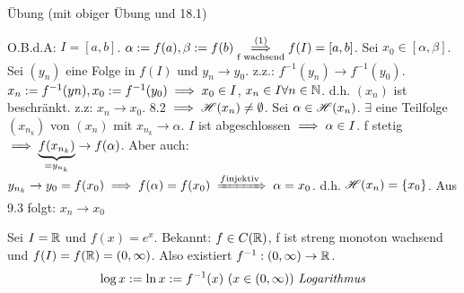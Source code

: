 \documentclass[a4paper,oneside,DIV15,BCOR12mm]{scrbook}
\begin{document}
\begin{beweis}
\begin{liste}
\item Übung (mit obiger Übung und 18.1)
\item O.B.d.A: $I=[a, b]$. $\alpha:=f(a), \beta:=f(b) \overset{(1)}{\underset{\text{f wachsend}}{\implies}} f(I)=[a,b]$. Sei $x_0 \in [\alpha, \beta]$. Sei $(y_n)$ eine Folge in $f(I)$ und $y_n \to y_0$. z.z.: $f^{-1}(y_n) \to f^{-1}(y_0)$. $x_n:=f^{-1}(yn), x_0:=f^{-1}(y_0) \implies x_0 \in I$, $x_n \in I \forall n \in \mathbb{N}$. d.h. $(x_n)$ ist beschränkt. z.z: $x_n \to x_0$. 8.2 $\implies \mathscr{H}(x_n) \ne \emptyset$. Sei $\alpha \in \mathscr{H}(x_n)$. $\exists$ eine Teilfolge $(x_{n_k})$ von $(x_n)$ mit $x_{n_k} \to \alpha$. $I$ ist abgeschlossen $\implies \alpha \in I$. f stetig $\implies \underbrace{f(x_{n_k})}_{=y_{n_k}} \to f(\alpha)$. Aber auch: $y_{n_k} \to y_0 = f(x_0) \folgt f(\alpha) = f(x_0) \folgtwegen{f \text{injektiv}} \alpha=x_0$. d.h. $\mathscr{H}(x_n)=\{x_0\}$. Aus 9.3 folgt: $x_n \to x_0$
\end{liste}
\end{beweis}

\begin{satz}
Sei $I=\mathbb{R}$ und $f(x)=e^x$. Bekannt: $f \in C(\mathbb{R})$, f ist streng monoton wachsend und $f(I) = f(\mathbb{R}) = (0, \infty)$. Also existiert $f^{-1}: (0, \infty) \to \mathbb{R}$. 
\[ \log x := \ln x := f^{-1}(x)\ (x \in (0, \infty))\ \text{\emph{Logarithmus}} \]
\end{satz}

\theoremstyle{nonumberbreak}
\newtheorem{eigenschaften}[satz]{Eigenschaften}
\end{document}
